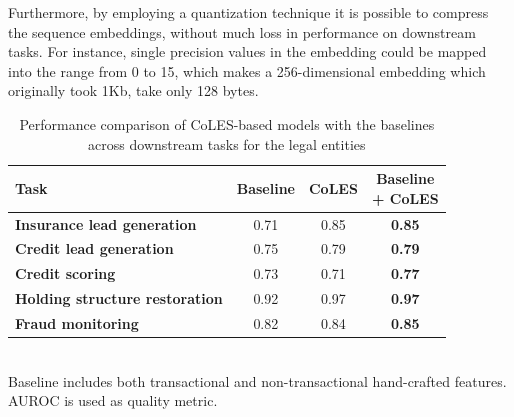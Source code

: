 \documentclass[sigconf]{acmart}
\newcommand{\attn}[1]{#1}
\begin{document}
Furthermore, by employing a quantization technique it is possible to compress
the sequence embeddings, without much loss in performance on downstream tasks.
% 
For instance, single precision values in the embedding could be mapped into
the range from 0 to 15, which makes a 256-dimensional embedding which originally
took 1Kb, take only 128 bytes.
%
% 


\begin{table}
    \centering
    \caption{
        Performance comparison of CoLES-based models with the baselines across downstream
        tasks for the legal entities
    }
    \begin{tabularx}{\linewidth}{Xccc}
        \toprule
            \textbf{Task}
            & \textbf{Baseline }
            & \textbf{CoLES}
            & \makecell{\textbf{Baseline} \\ \textbf{+ CoLES}}
            \\ 
        \midrule
            \textbf{Insurance lead generation} & 0.71 & 0.85 & \textbf{0.85} \\
            \textbf{Credit lead generation} & 0.75 & 0.79 & \textbf{0.79} \\
            \textbf{Credit scoring} & 0.73 & 0.71 & \textbf{0.77} \\
            \textbf{Holding structure restoration} & 0.92 & 0.97 & \textbf{0.97} \\
            \textbf{Fraud monitoring} & 0.82 & 0.84 & \textbf{0.85} \\
        \bottomrule
    \end{tabularx}%
    \\
    \small{
        Baseline includes both transactional and non-transactional hand-crafted
        features. AUROC is used as quality metric.
    }
    \label{tab-internal-company}
\end{table}
\end{document}
